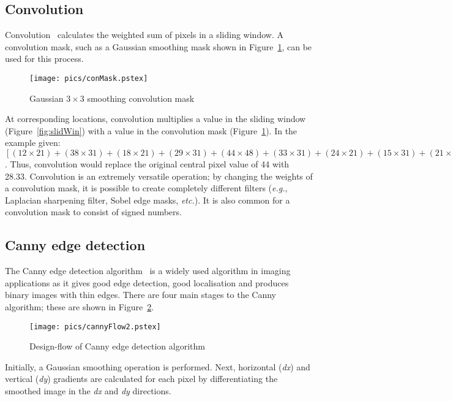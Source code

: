 \documentclass[10pt,twocolumn,letterpaper]{article}
\begin{document}
\subsection{Convolution}
Convolution~\cite{russbk} calculates the weighted sum of pixels in a sliding window.
A convolution mask, such as a Gaussian smoothing mask shown in Figure~\ref{fig:conMask}, can be used for this process.
\begin{figure}[!htb]
\begin{center}
\setlength{\abovecaptionskip}{-0.25cm}
        \texttt{[image: pics/conMask.pstex]}
        \caption{Gaussian $3\times3$ smoothing convolution mask}
        \label{fig:conMask}
\setlength{\abovecaptionskip}{0cm}
\end{center}
\end{figure}
At corresponding locations, convolution multiplies a value in the sliding window (Figure~\ref{fig:slidWin}) with a value 
in the convolution mask (Figure~\ref{fig:conMask}). In the example given:
$[(12\times21)+(38\times31)+(18\times21)+
(29\times31)+(44\times48)+(33\times31)+
(24\times21)+(15\times31)+(21\times21) ] / 256 = 7252/256 = 28.33$.
Thus, convolution would replace the original central pixel value of 44 with 28.33.
Convolution is an extremely versatile operation;
by changing the weights of a convolution mask, it is possible to create completely different filters (\emph{e.g.}, Laplacian 
sharpening filter, Sobel edge masks, \emph{etc.}). 
It is also common for a convolution mask to consist of signed numbers.

\subsection{Canny edge detection}
\label{sec:softcanny}
The Canny edge detection algorithm~\cite{russbk, canny86} is a widely used algorithm in imaging applications as
it gives good edge detection, good localisation
and produces binary images with thin edges.
There are four main stages to the Canny algorithm; these are shown in Figure~\ref{fig:cannyFlow2}.
\begin{figure}[!htb]
\begin{center}
\setlength{\abovecaptionskip}{-0.25cm}
        \texttt{[image: pics/cannyFlow2.pstex]}
        \caption{Design-flow of Canny edge detection algorithm}
        \label{fig:cannyFlow2}
\setlength{\abovecaptionskip}{0cm}
\end{center}
\end{figure}
Initially, a Gaussian smoothing operation is performed. 
Next, horizontal (\emph{dx}) and vertical (\emph{dy}) gradients are calculated 
for each pixel by differentiating the smoothed image in 
the \emph{dx} and \emph{dy} directions.  
\end{document}
